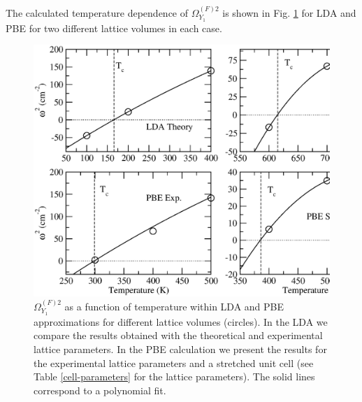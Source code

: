 The calculated temperature dependence of $\Omega^{(F)2}_{Y_{1}}$ is shown in Fig. \ref{freq-y1-snse} for LDA and PBE for two different lattice volumes in each case.
\begin{figure}[h]
\begin{center}
\includegraphics[width=0.9\linewidth]{Figures/freq-main-snse.eps}
	\caption[Phonon collapse in SnSe.]{$\Omega^{(F)2}_{Y_{1}}$ as a function of temperature within LDA and PBE approximations for different lattice volumes (circles). In the LDA we compare the results obtained with the theoretical and 
experimental\cite{zhao2014ultralow} lattice parameters. In the PBE calculation we present the results for the experimental lattice parameters and a stretched unit cell (see Table \ref{cell-parameters} for the lattice
parameters). The solid lines correspond to a polynomial fit.}
\label{freq-y1-snse}
\end{center}
\end{figure}
